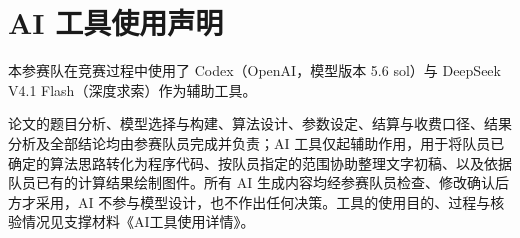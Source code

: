 \section*{AI 工具使用声明}
本参赛队在竞赛过程中使用了 Codex（OpenAI，模型版本 5.6 sol）与 DeepSeek V4.1 Flash（深度求索）作为辅助工具。

论文的题目分析、模型选择与构建、算法设计、参数设定、结算与收费口径、结果分析及全部结论均由参赛队员完成并负责；AI 工具仅起辅助作用，用于将队员已确定的算法思路转化为程序代码、按队员指定的范围协助整理文字初稿、以及依据队员已有的计算结果绘制图件。所有 AI 生成内容均经参赛队员检查、修改确认后方才采用，AI 不参与模型设计，也不作出任何决策。工具的使用目的、过程与核验情况见支撑材料《AI工具使用详情》。
